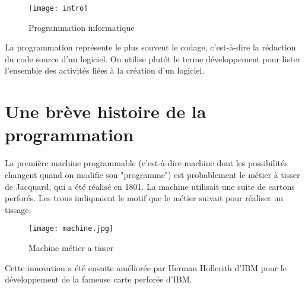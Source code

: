 \documentclass[12pt,a4paper]{article}
\begin{document}
    
    \begin{figure}[!h]
        \centering
        \texttt{[image: intro]}
        \caption{Programmation informatique}
        \label{fig:introduction}
    \end{figure}
    
    
    La programmation représente le plus souvent le codage, c’est-à-dire la rédaction du code source d'un logiciel. On utilise plutôt le terme développement pour lister l'ensemble des activités liées à la création d'un logiciel.
    
    
    \section{\label{histoire}Une brève histoire de la programmation}
    La première machine programmable (c’est-à-dire machine dont les possibilités changent quand on modifie son "programme") est probablement le métier à tisser de Jacquard, qui a été réalisé en 1801. La machine utilisait une suite de cartons perforés. Les trous indiquaient le motif que le métier suivait pour réaliser un tissage.\\
    
    
    \begin{figure}[!h]
        \centering
        \texttt{[image: machine.jpg]}
        \caption{Machine métier a tisser}
        \label{fig:Métier a tisser}
    \end{figure}
    
    
    \newpage
    
    
    Cette innovation a été ensuite améliorée par Herman Hollerith d'IBM pour le développement de la fameuse carte perforée d'IBM.\\
    
\end{document}
